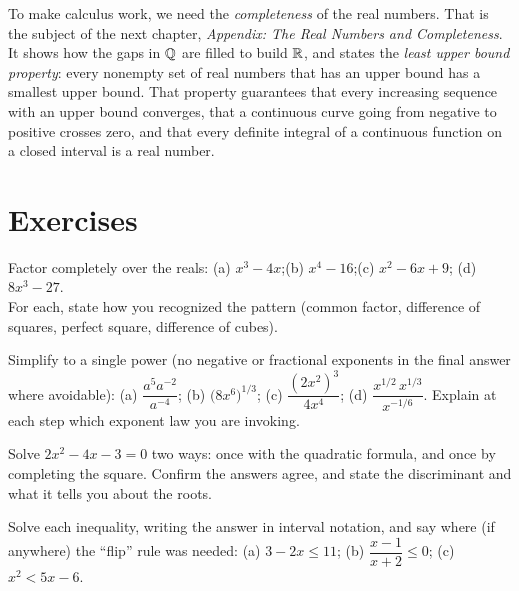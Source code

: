 \begin{connectionbox}
To make calculus work, we need the \emph{completeness} of the real numbers. That
is the subject of the next chapter, \emph{Appendix: The Real Numbers and
Completeness}. It shows how the gaps in $\mathbb{Q}$ are filled to build $\mathbb{R}$, and states
the \emph{least upper bound property}: every nonempty set of real numbers that
has an upper bound has a smallest upper bound. That property guarantees that
every increasing sequence with an upper bound converges, that a continuous curve
going from negative to positive crosses zero, and that every definite integral of
a continuous function on a closed interval is a real number.
\end{connectionbox}

\section*{Exercises}

\begin{exercise}
\label{ch40:exr-factor}
Factor completely over the reals:
(a) $x^3 - 4x$;\quad (b) $x^4 - 16$;\quad (c) $x^2 - 6x + 9$;\quad
(d) $8x^3 - 27$. \\
For each, state how you recognized the pattern (common factor, difference of
squares, perfect square, difference of cubes).
\end{exercise}

\begin{exercise}
\label{ch40:exr-exponents}
Simplify to a single power (no negative or fractional exponents in the final
answer where avoidable):
(a) $\dfrac{a^5 a^{-2}}{a^{-4}}$;\quad
(b) $\bigl(8x^6\bigr)^{1/3}$;\quad
(c) $\dfrac{(2x^2)^3}{4x^4}$;\quad
(d) $\dfrac{x^{1/2}\,x^{1/3}}{x^{-1/6}}$.
Explain at each step which exponent law you are invoking.
\end{exercise}

\begin{exercise}
\label{ch40:exr-quadratic}
Solve $2x^2 - 4x - 3 = 0$ two ways: once with the quadratic formula, and once by
completing the square. Confirm the answers agree, and state the discriminant and
what it tells you about the roots.
\end{exercise}

\begin{exercise}
\label{ch40:exr-inequality}
Solve each inequality, writing the answer in interval notation, and say where (if
anywhere) the ``flip'' rule was needed:
(a) $3 - 2x \le 11$;\quad
(b) $\dfrac{x-1}{x+2} \le 0$;\quad
(c) $x^2 < 5x - 6$.
\end{exercise}

